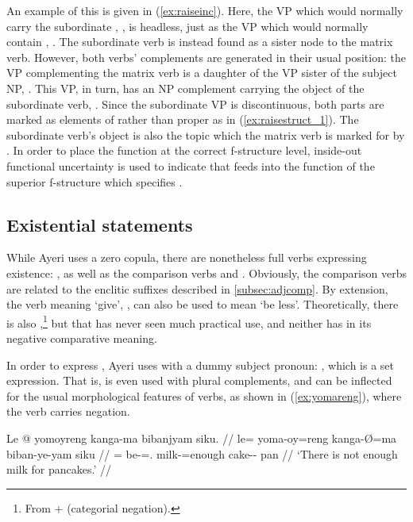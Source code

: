 An example of this is given in (\ref{ex:raiseinc}). Here, the VP which would
normally carry the subordinate , , is
headless, just as the VP which would normally contain ,
. The subordinate verb is instead found
as a sister node to the matrix verb. However, both verbs' complements are
generated in their usual position: the VP complementing the matrix verb is a
daughter of the VP sister of the subject NP, . This
VP, in turn, has an NP complement carrying the object of the subordinate verb,
. Since the subordinate VP is discontinuous, both
parts are marked as elements of \XCompl{} rather than \XCompl{} proper as in
(\ref{ex:raisestruct_1}). The subordinate verb's object is also the topic which
the matrix verb is marked for by . In order to place the \Top{}
function at the correct f-structure level, inside-out functional uncertainty
is used to indicate that  feeds into the \Top{} function of
the superior f-structure which specifies \XCompl{}.

\subsection{Existential statements}
\label{subsec:exs}

While Ayeri uses a zero copula, there are nonetheless full verbs expressing
existence: , as well as the
comparison verbs   and
. Obviously, the comparison verbs are related to the
enclitic suffixes described in \autoref{subsec:adjcomp}. By extension, the verb
meaning `give', , can also be used to mean `be less'.
Theoretically, there is also ,\footnote{From
 +  (categorial negation).} but that
has never seen much practical use, and neither has  in its
negative comparative meaning.

In order to express , Ayeri uses  with a dummy
subject pronoun: , which is a set
expression. That is,  is even used with plural
complements, and can be inflected for the usual morphological features of
verbs, as shown in (\ref{ex:yomareng}), where the verb carries negation.

\pex\label{ex:yomareng}
\a\label{ex:yomareng_sg}\begingl
	\gla Le @ yomoyreng kanga-ma bibanjyam siku. //
	\glb le= yoma-oy=reng kanga-Ø=ma biban-ye-yam siku //
	\glc \PatTI{}= be-\Neg{}=\TsgI{}.\Aarg{} milk-\Top{}=enough
		cake-\Pl{}-\Dat {} pan //
	\glft `There is not enough milk for pancakes.' //
\endgl


